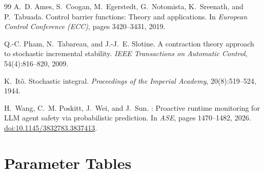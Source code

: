 \documentclass[11pt,twocolumn]{article}
\begin{document}
\begin{thebibliography}{99}
A.~D. Ames, S.~Coogan, M.~Egerstedt, G.~Notomista, K.~Sreenath, and
  P.~Tabuada.
\newblock Control barrier functions: Theory and applications.
\newblock In \emph{European Control Conference (ECC)}, pages 3420--3431, 2019.

Q.-C. Pham, N.~Tabareau, and J.-J.~E. Slotine.
\newblock A contraction theory approach to stochastic incremental stability.
\newblock \emph{IEEE Transactions on Automatic Control}, 54(4):816--820, 2009.

K.~It\^{o}.
\newblock Stochastic integral.
\newblock \emph{Proceedings of the Imperial Academy}, 20(8):519--524, 1944.

H.~Wang, C.~M. Poskitt, J.~Wei, and J.~Sun.
: Proactive runtime monitoring for {LLM} agent
  safety via probabilistic prediction.
\newblock In \emph{ASE}, pages 1470--1482, 2026.
\newblock \href{https://doi.org/10.1145/3832783.3837413}{doi:10.1145/3832783.3837413}.

\end{thebibliography}


\appendix

\section{Parameter Tables}
\label{app:parameters}
\end{document}
